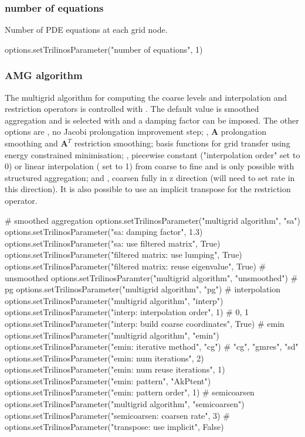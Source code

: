 \subsubsection{number of equations}
Number of PDE equations at each grid node.
\begin{python}
options.setTrilinosParameter("number of equations", 1)        
\end{python}

\subsubsection{AMG algorithm}
The multigrid algorithm for computing the coarse levels and interpolation and restriction operators is controlled with . The default value is smoothed aggregation and is selected with  and a damping factor can be imposed.  The other options are , no Jacobi prolongation improvement step; , $\mathbf{A}$ prolongation smoothing and $\mathbf{A}^T$ restriction smoothing;  basis functions for grid transfer using energy constrained minimisation; , piecewise constant ("interpolation order" set to 0) or linear interpolation ( set to 1) from coarse to fine and is only possible with structured aggregation; and , coarsen fully in z direction (will need to set rate in this direction).   It is also possible to use an implicit transpose for the restriction operator.
\begin{python}
# smoothed aggregation
options.setTrilinosParameter("multigrid algorithm", "sa")
options.setTrilinosParameter("sa: damping factor", 1.3)
options.setTrilinosParameter("sa: use filtered matrix", True)
options.setTrilinosParameter("filtered matrix: use lumping", True)
options.setTrilinosParameter("filtered matrix: reuse eigenvalue", True)
# unsmoothed
options.setTrilinosParamter("multigrid algorithm", "unsmoothed")
# pg
options.setTrilinosParameter("multigrid algorithm", "pg")
# interpolation
options.setTrilinosParameter("multigrid algorithm", "interp")
options.setTrilinosParameter("interp: interpolation order", 1)    
                                                          # 0, 1
options.setTrilinosParameter("interp: build coarse coordinates", True)
# emin
options.setTrilinosParameter("multigrid algorithm", "emin")
options.setTrilinosParameter("emin: iterative method", "cg") 
                                                     # "cg", "gmres", "sd"
options.setTrilinosParameter("emin: num iterations", 2)
options.setTrilinosParameter("emin: num reuse iterations", 1)
options.setTrilinosParameter("emin: pattern", "AkPtent")
options.setTrilinosParameter("emin: pattern order", 1)
# semicoarsen
options.setTrilinosParameter("multigrid algorithm", "semicoarsen")
options.setTrilinosParameter("semicoarsen: coarsen rate", 3)
#
options.setTrilinosParameter("transpose: use implicit", False) 
\end{python}

